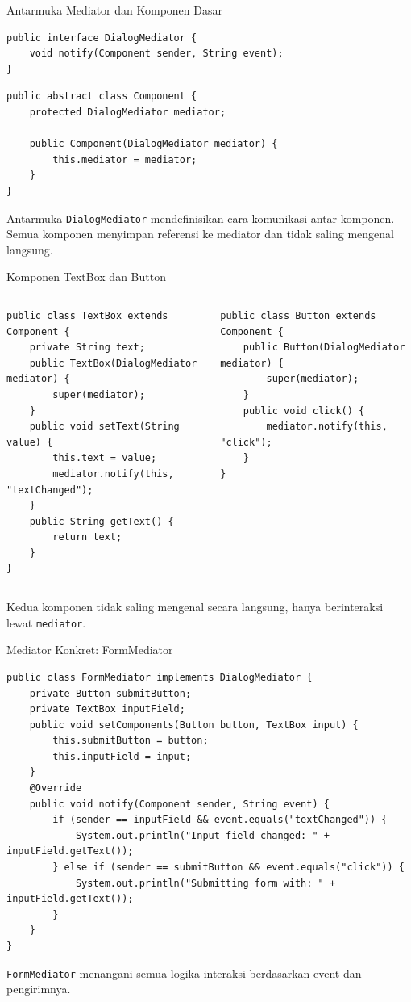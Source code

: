 \documentclass[aspectratio=169, table]{beamer}
\begin{document}
\begin{frame}[fragile]{Antarmuka Mediator dan Komponen Dasar}
\begin{lstlisting}[style=JavaStyle]
public interface DialogMediator {
	void notify(Component sender, String event);
}
\end{lstlisting}

\begin{lstlisting}[style=JavaStyle]
public abstract class Component {
	protected DialogMediator mediator;
	
	public Component(DialogMediator mediator) {
		this.mediator = mediator;
	}
}
\end{lstlisting}

\small Antarmuka \texttt{DialogMediator} mendefinisikan cara komunikasi antar komponen. Semua komponen menyimpan referensi ke mediator dan tidak saling mengenal langsung.
\end{frame}

\begin{frame}[fragile]{Komponen TextBox dan Button}
	\vspace{20pt}
\begin{columns}[t]
\begin{lstlisting}[style=JavaStyle]
public class TextBox extends Component {
	private String text;
	public TextBox(DialogMediator mediator) {
		super(mediator);
	}
	public void setText(String value) {
		this.text = value;
		mediator.notify(this, "textChanged");
	}
	public String getText() {
		return text;
	}
}
\end{lstlisting}

\begin{lstlisting}[style=JavaStyle]
public class Button extends Component {
	public Button(DialogMediator mediator) {
		super(mediator);
	}
	public void click() {
		mediator.notify(this, "click");
	}
}
\end{lstlisting}
\end{columns}

\small Kedua komponen tidak saling mengenal secara langsung, hanya berinteraksi lewat \texttt{mediator}.
\end{frame}


\begin{frame}[fragile]{Mediator Konkret: FormMediator}
	\vspace{20pt}
\begin{lstlisting}[style=JavaStyle]
public class FormMediator implements DialogMediator {
	private Button submitButton;
	private TextBox inputField;
	public void setComponents(Button button, TextBox input) {
		this.submitButton = button;
		this.inputField = input;
	}
	@Override
	public void notify(Component sender, String event) {
		if (sender == inputField && event.equals("textChanged")) {
			System.out.println("Input field changed: " + inputField.getText());
		} else if (sender == submitButton && event.equals("click")) {
			System.out.println("Submitting form with: " + inputField.getText());
		}
	}
}
\end{lstlisting}

\small \texttt{FormMediator} menangani semua logika interaksi berdasarkan event dan pengirimnya.
\end{frame}
\end{document}
